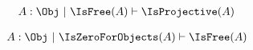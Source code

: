 \begin{sequent}
\begin{align*}
  A:\Obj ~|~ \IsFree( A ) \vdash \IsProjective( A )
\end{align*}
\end{sequent}

\begin{sequent}
\begin{align*}
  A:\Obj ~|~ \IsZeroForObjects( A ) \vdash \IsFree( A )
\end{align*}
\end{sequent}